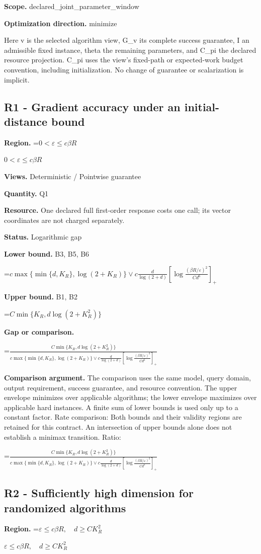 \documentclass[10pt,a4paper]{article}
\newcommand{\AtlasMath}[1]{\par\begingroup\centering\setbox0=\hbox{$\displaystyle #1$}\ifdim\wd0>1.4\linewidth\typeout{ATLAS WIDE FORMULA: \the\wd0}\fi\ifdim\wd0>\linewidth\resizebox{\linewidth}{!}{\box0}\else\box0\fi\par\endgroup}
\newcommand{\AtlasInlineMath}[1]{\begingroup\setbox0=\hbox{$#1$}\ifdim\wd0>.4\linewidth\endgroup\AtlasMath{#1}\else\endgroup$#1$\fi}
\begin{document}
\textbf{Scope.} declared\_joint\_parameter\_window

\textbf{Optimization direction.} minimize

Here v is the selected algorithm view, G\_v its complete success guarantee, I an admissible fixed instance, theta the remaining parameters, and C\_pi the declared resource projection. C\_pi uses the view's fixed-path or expected-work budget convention, including initialization. No change of guarantee or scalarization is implicit.

\subsection{R1 - Gradient accuracy under an initial-distance bound}
\textbf{Region.} \AtlasInlineMath{0<\varepsilon\le c\beta R}

\textbf{Views.} Deterministic / Pointwise guarantee

\textbf{Quantity.} Q1

\textbf{Resource.} One declared full first-order response costs one call; its vector coordinates are not charged separately.

\textbf{Status.} Logarithmic gap

\textbf{Lower bound.} B3, B5, B6

\AtlasMath{c\max\{\min\{d,K_R\},\log(2+K_R)\}\vee c\frac d{\log(2+d)}\left[\log\frac{(\beta R/\varepsilon)^2}{Cd^{6}}\right]_+}
\textbf{Upper bound.} B1, B2

\AtlasMath{C\min\{K_R,d\log(2+K_R^2)\}}
\textbf{Gap or comparison.} 
\AtlasMath{\frac{C\min\{K_R,d\log(2+K_R^2)\}}{c\max\{\min\{d,K_R\},\log(2+K_R)\}\vee c\frac d{\log(2+d)}\left[\log\frac{(\beta R/\varepsilon)^2}{Cd^{6}}\right]_+}}


\textbf{Comparison argument.} The comparison uses the same model, query domain, output requirement, success guarantee, and resource convention. The upper envelope minimizes over applicable algorithms; the lower envelope maximizes over applicable hard instances. A finite sum of lower bounds is used only up to a constant factor. Rate comparison: Both bounds and their validity regions are retained for this contract. An intersection of upper bounds alone does not establish a minimax transition. Ratio: 
\AtlasMath{\frac{C\min\{K_R,d\log(2+K_R^2)\}}{c\max\{\min\{d,K_R\},\log(2+K_R)\}\vee c\frac d{\log(2+d)}\left[\log\frac{(\beta R/\varepsilon)^2}{Cd^{6}}\right]_+}}


\subsection{R2 - Sufficiently high dimension for randomized algorithms}
\textbf{Region.} \AtlasInlineMath{\varepsilon\le c\beta R,\quad d\ge CK_R^2}
\end{document}
